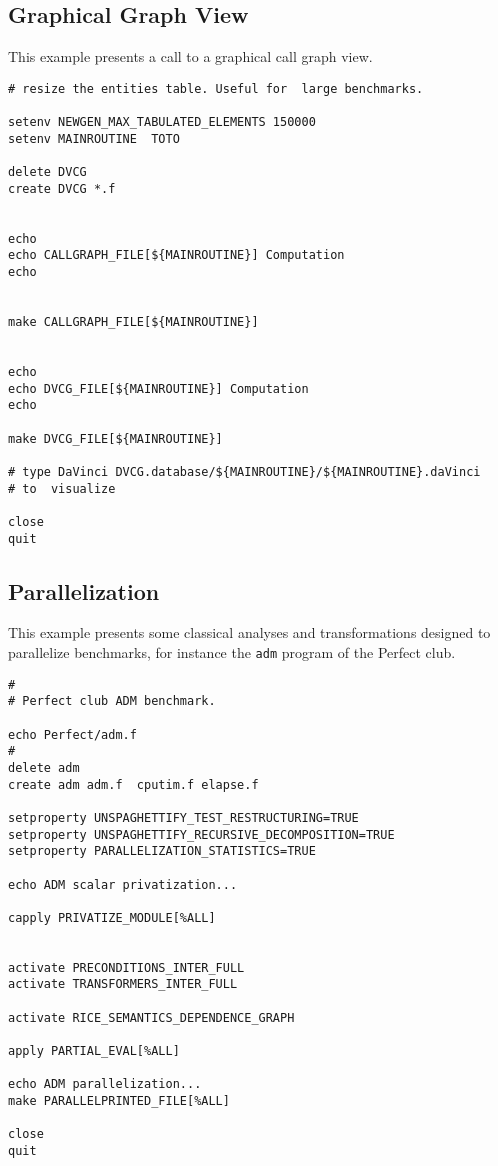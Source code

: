 \documentclass[a4paper,12pt]{article}
\begin{document}
\subsection{Graphical  Graph View}
\label{exm5}

This example presents a call to a graphical call graph view.

\begin{verbatim}
# resize the entities table. Useful for  large benchmarks. 

setenv NEWGEN_MAX_TABULATED_ELEMENTS 150000
setenv MAINROUTINE  TOTO 

delete DVCG
create DVCG *.f


echo
echo CALLGRAPH_FILE[${MAINROUTINE}] Computation
echo


make CALLGRAPH_FILE[${MAINROUTINE}]


echo
echo DVCG_FILE[${MAINROUTINE}] Computation
echo

make DVCG_FILE[${MAINROUTINE}]

# type DaVinci DVCG.database/${MAINROUTINE}/${MAINROUTINE}.daVinci
# to  visualize 

close 
quit
\end{verbatim}


\subsection{Parallelization}
\label{exm6}

This example presents some classical analyses and transformations designed
to parallelize benchmarks, for instance the \texttt{adm} program of the
Perfect club.

\begin{verbatim}
#
# Perfect club ADM benchmark.

echo Perfect/adm.f
#
delete adm
create adm adm.f  cputim.f elapse.f 

setproperty UNSPAGHETTIFY_TEST_RESTRUCTURING=TRUE
setproperty UNSPAGHETTIFY_RECURSIVE_DECOMPOSITION=TRUE
setproperty PARALLELIZATION_STATISTICS=TRUE

echo ADM scalar privatization...
 
capply PRIVATIZE_MODULE[%ALL]


activate PRECONDITIONS_INTER_FULL
activate TRANSFORMERS_INTER_FULL

activate RICE_SEMANTICS_DEPENDENCE_GRAPH

apply PARTIAL_EVAL[%ALL]

echo ADM parallelization...
make PARALLELPRINTED_FILE[%ALL]

close
quit
\end{verbatim}
\end{document}
